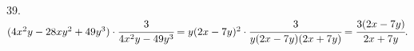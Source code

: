39. $(4x^2y-28xy^2+49y^3)\cdot\cfrac{3}{4x^2y-49y^3}=y(2x-7y)^2\cdot\cfrac{3}{y(2x-7y)(2x+7y)}=\cfrac{3(2x-7y)}{2x+7y}.$\\
